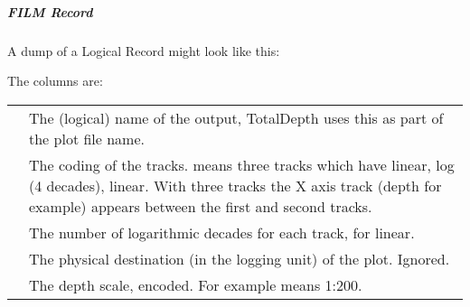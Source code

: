 \documentclass[letterpaper,10pt,english]{sphinxmanual}
\begin{document}
\subparagraph{FILM Record}
\label{\detokenize{tech/plotting:film-record}}
A dump of a  Logical Record might look like this:

\begin{sphinxVerbatim}[commandchars=\\\{\}]
     

        

             
             
\end{sphinxVerbatim}

The columns are:


\begin{savenotes}\sphinxattablestart
\centering
\begin{tabulary}{\linewidth}[t]{|T|T|}
\hline
{}\relax &\relax \\
\hline
{}
&
The (logical) name of the output, TotalDepth uses this as part of the plot file name.
\\
\hline
{}
&
The coding of the tracks.  means three tracks which have linear, log (4 decades), linear.
With three tracks the X axis track (depth for example) appears between the first and second tracks.
\\
\hline
{}
&
The number of logarithmic decades for each track, \sphinxcode{-} for linear.
\\
\hline
{}
&
The physical destination (in the logging unit) of the plot. Ignored.
\\
\hline
{}
&
The depth scale, encoded. For example  means 1:200.
\\
\hline
\end{tabulary}
\par
\sphinxattableend\end{savenotes}
\end{document}
